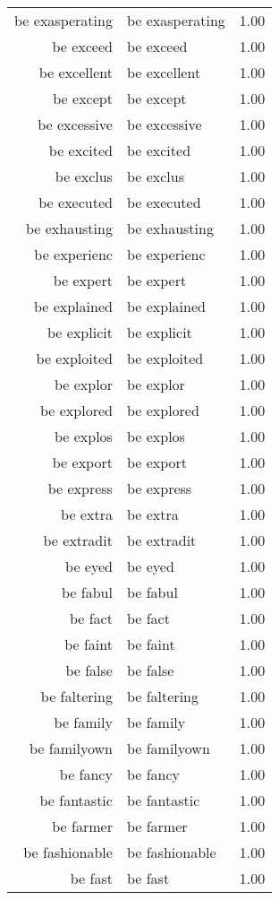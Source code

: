 \begin{table}[ht]
\begin{tabular}{rlr}
  be exasperating & be exasperating & 1.00 \\ 
  be exceed & be exceed & 1.00 \\ 
  be excellent & be excellent & 1.00 \\ 
  be except & be except & 1.00 \\ 
  be excessive & be excessive & 1.00 \\ 
  be excited & be excited & 1.00 \\ 
  be exclus & be exclus & 1.00 \\ 
  be executed & be executed & 1.00 \\ 
  be exhausting & be exhausting & 1.00 \\ 
  be experienc & be experienc & 1.00 \\ 
  be expert & be expert & 1.00 \\ 
  be explained & be explained & 1.00 \\ 
  be explicit & be explicit & 1.00 \\ 
  be exploited & be exploited & 1.00 \\ 
  be explor & be explor & 1.00 \\ 
  be explored & be explored & 1.00 \\ 
  be explos & be explos & 1.00 \\ 
  be export & be export & 1.00 \\ 
  be express & be express & 1.00 \\ 
  be extra & be extra & 1.00 \\ 
  be extradit & be extradit & 1.00 \\ 
  be eyed & be eyed & 1.00 \\ 
  be fabul & be fabul & 1.00 \\ 
  be fact & be fact & 1.00 \\ 
  be faint & be faint & 1.00 \\ 
  be false & be false & 1.00 \\ 
  be faltering & be faltering & 1.00 \\ 
  be family & be family & 1.00 \\ 
  be familyown & be familyown & 1.00 \\ 
  be fancy & be fancy & 1.00 \\ 
  be fantastic & be fantastic & 1.00 \\ 
  be farmer & be farmer & 1.00 \\ 
  be fashionable & be fashionable & 1.00 \\ 
  be fast & be fast & 1.00 \\ 

\end{tabular}
\end{table}
